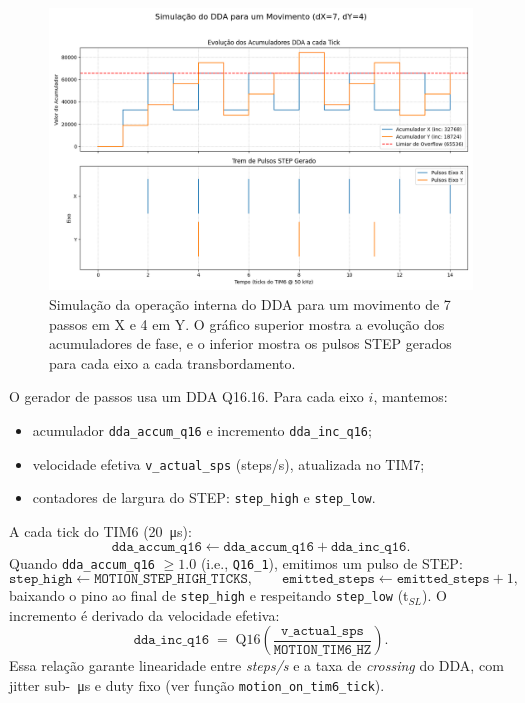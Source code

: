 \begin{figure}[H]
    \centering
    \includegraphics[width=\textwidth]{Cap03/firmware_dda_simulation.png}
    \caption{Simula\c{c}\~ao da opera\c{c}\~ao interna do DDA para um movimento de 7 passos em X e 4 em Y. O gr\'afico superior mostra a evolu\c{c}\~ao dos acumuladores de fase, e o inferior mostra os pulsos STEP gerados para cada eixo a cada transbordamento.}
    \label{fig:firmware_dda_sim}
\end{figure}

O gerador de passos usa um DDA Q16.16. Para cada eixo $i$, mantemos:
\begin{itemize}
  \item acumulador \texttt{dda\_accum\_q16} e incremento \texttt{dda\_inc\_q16};
  \item velocidade efetiva \texttt{v\_actual\_sps} (steps/s), atualizada no TIM7;
  \item contadores de largura do STEP: \texttt{step\_high} e \texttt{step\_low}.
\end{itemize}
A cada tick do TIM6 (\SI{20}{\micro s}):
\[
\texttt{dda\_accum\_q16} \leftarrow \texttt{dda\_accum\_q16} + \texttt{dda\_inc\_q16}.
\]
Quando \texttt{dda\_accum\_q16} $\ge 1.0$ (i.e., \texttt{Q16\_1}), emitimos um pulso de STEP:
\[
\texttt{step\_high} \leftarrow \texttt{MOTION\_STEP\_HIGH\_TICKS},\qquad
\texttt{emitted\_steps} \leftarrow \texttt{emitted\_steps}+1,
\]
baixando o pino ao final de \texttt{step\_high} e respeitando \texttt{step\_low} (t$_{SL}$).
O incremento \'e derivado da velocidade efetiva:
\[
\texttt{dda\_inc\_q16} \;=\; \mathrm{Q16}\!\left(\frac{\texttt{v\_actual\_sps}}{\texttt{MOTION\_TIM6\_HZ}}\right).
\]
Essa rela\c{c}\~ao garante linearidade entre \emph{steps/s} e a taxa de \emph{crossing} do DDA, com jitter sub-\SI{}{\micro s} e duty fixo (ver fun\c{c}\~ao \texttt{motion\_on\_tim6\_tick}).

